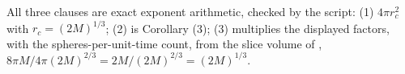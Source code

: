 All three clauses are exact exponent arithmetic, checked by the script: (1) $4\pi r_c^2$ with $r_c = (2M)^{1/3}$; (2) is Corollary (3); (3) multiplies the displayed factors, with the spheres-per-unit-time count, from the slice volume of , $8\pi M / 4\pi(2M)^{2/3} = 2M/(2M)^{2/3} = (2M)^{1/3}$.
